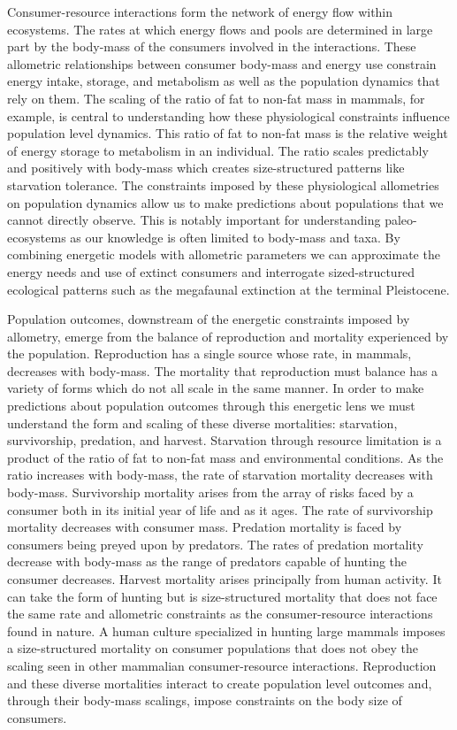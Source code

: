 \documentclass[11pt]{article}
\begin{document}
Consumer-resource interactions form the network of energy flow within ecosystems. The rates at which energy flows and pools are determined in large part by the body-mass of the consumers involved in the interactions. These allometric relationships between consumer body-mass and energy use constrain energy intake, storage, and metabolism as well as the population dynamics that rely on them. The scaling of the ratio of fat to non-fat mass in mammals, for example, is central to understanding how these physiological constraints influence population level dynamics. This ratio of fat to non-fat mass is the relative weight of energy storage to metabolism in an individual. The ratio scales predictably and positively with body-mass which creates size-structured patterns like starvation tolerance. The constraints imposed by these physiological allometries on population dynamics allow us to make predictions about populations that we cannot directly observe. This is notably important for understanding paleo-ecosystems as our knowledge is often limited to body-mass and taxa. By combining energetic models with allometric parameters we can approximate the energy needs and use of extinct consumers and interrogate sized-structured ecological patterns such as the megafaunal extinction at the terminal Pleistocene. 



Population outcomes, downstream of the energetic constraints imposed by allometry, emerge from the balance of reproduction and mortality experienced by the population. Reproduction has a single source whose rate, in mammals, decreases with body-mass. The mortality that reproduction must balance has a variety of forms which do not all scale in the same manner. In order to make predictions about population outcomes through this energetic lens we must understand the form and scaling of these diverse mortalities: starvation, survivorship, predation, and harvest.  Starvation through resource limitation is a product of the ratio of fat to non-fat mass and environmental conditions. As the ratio increases with body-mass, the rate of starvation mortality decreases with body-mass. Survivorship mortality arises from the array of risks faced by a consumer both in its initial year of life and as it ages.  The rate of survivorship mortality decreases with consumer mass. Predation mortality is faced by consumers being preyed upon by predators. The rates of predation mortality decrease with body-mass as the range of predators capable of hunting the consumer decreases. Harvest mortality arises principally from human activity. It can take the form of hunting but is size-structured mortality that does not face the same rate and allometric constraints as the consumer-resource interactions found in nature. A human culture specialized in hunting large mammals imposes a size-structured mortality on consumer populations that does not obey the scaling seen in other mammalian consumer-resource interactions. Reproduction and these diverse mortalities interact to create population level outcomes and, through their body-mass scalings, impose constraints on the body size of consumers.
\end{document}
